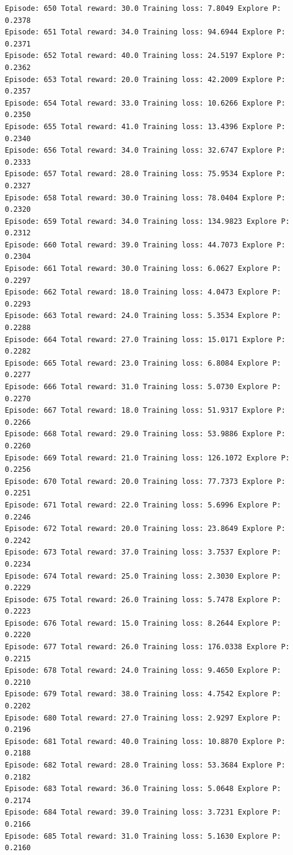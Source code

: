 \documentclass[11pt]{article}
\begin{document}
\begin{Verbatim}[commandchars=\\\{\}]
Episode: 650 Total reward: 30.0 Training loss: 7.8049 Explore P: 0.2378
Episode: 651 Total reward: 34.0 Training loss: 94.6944 Explore P: 0.2371
Episode: 652 Total reward: 40.0 Training loss: 24.5197 Explore P: 0.2362
Episode: 653 Total reward: 20.0 Training loss: 42.2009 Explore P: 0.2357
Episode: 654 Total reward: 33.0 Training loss: 10.6266 Explore P: 0.2350
Episode: 655 Total reward: 41.0 Training loss: 13.4396 Explore P: 0.2340
Episode: 656 Total reward: 34.0 Training loss: 32.6747 Explore P: 0.2333
Episode: 657 Total reward: 28.0 Training loss: 75.9534 Explore P: 0.2327
Episode: 658 Total reward: 30.0 Training loss: 78.0404 Explore P: 0.2320
Episode: 659 Total reward: 34.0 Training loss: 134.9823 Explore P: 0.2312
Episode: 660 Total reward: 39.0 Training loss: 44.7073 Explore P: 0.2304
Episode: 661 Total reward: 30.0 Training loss: 6.0627 Explore P: 0.2297
Episode: 662 Total reward: 18.0 Training loss: 4.0473 Explore P: 0.2293
Episode: 663 Total reward: 24.0 Training loss: 5.3534 Explore P: 0.2288
Episode: 664 Total reward: 27.0 Training loss: 15.0171 Explore P: 0.2282
Episode: 665 Total reward: 23.0 Training loss: 6.8084 Explore P: 0.2277
Episode: 666 Total reward: 31.0 Training loss: 5.0730 Explore P: 0.2270
Episode: 667 Total reward: 18.0 Training loss: 51.9317 Explore P: 0.2266
Episode: 668 Total reward: 29.0 Training loss: 53.9886 Explore P: 0.2260
Episode: 669 Total reward: 21.0 Training loss: 126.1072 Explore P: 0.2256
Episode: 670 Total reward: 20.0 Training loss: 77.7373 Explore P: 0.2251
Episode: 671 Total reward: 22.0 Training loss: 5.6996 Explore P: 0.2246
Episode: 672 Total reward: 20.0 Training loss: 23.8649 Explore P: 0.2242
Episode: 673 Total reward: 37.0 Training loss: 3.7537 Explore P: 0.2234
Episode: 674 Total reward: 25.0 Training loss: 2.3030 Explore P: 0.2229
Episode: 675 Total reward: 26.0 Training loss: 5.7478 Explore P: 0.2223
Episode: 676 Total reward: 15.0 Training loss: 8.2644 Explore P: 0.2220
Episode: 677 Total reward: 26.0 Training loss: 176.0338 Explore P: 0.2215
Episode: 678 Total reward: 24.0 Training loss: 9.4650 Explore P: 0.2210
Episode: 679 Total reward: 38.0 Training loss: 4.7542 Explore P: 0.2202
Episode: 680 Total reward: 27.0 Training loss: 2.9297 Explore P: 0.2196
Episode: 681 Total reward: 40.0 Training loss: 10.8870 Explore P: 0.2188
Episode: 682 Total reward: 28.0 Training loss: 53.3684 Explore P: 0.2182
Episode: 683 Total reward: 36.0 Training loss: 5.0648 Explore P: 0.2174
Episode: 684 Total reward: 39.0 Training loss: 3.7231 Explore P: 0.2166
Episode: 685 Total reward: 31.0 Training loss: 5.1630 Explore P: 0.2160

\end{Verbatim}
\end{document}
